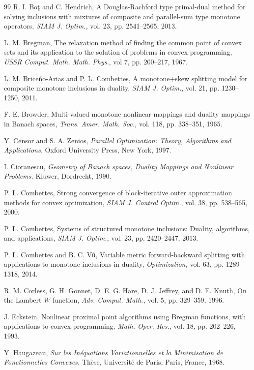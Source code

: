 \documentclass[a4paper,11pt,fleqn]{article}
\theoremstyle{plain}{\theorembodyfont{\rmfamily}%
\newtheorem{conjecture}[theorem]{Conjecture}}
\theoremstyle{plain}{\theorembodyfont{\rmfamily}%
\newtheorem{example}[theorem]{Example}}
\theoremstyle{plain}{\theorembodyfont{\rmfamily}%
\newtheorem{remark}[theorem]{Remark}}
\theoremstyle{plain}{\theorembodyfont{\rmfamily}%
\newtheorem{algorithm}[theorem]{Algorithm}}
\theoremstyle{plain}{\theorembodyfont{\rmfamily}%
\newtheorem{condition}[theorem]{Condition}}
\theoremstyle{plain}{\theorembodyfont{\rmfamily}%
\newtheorem{definition}[theorem]{Definition}}
\theoremstyle{plain}{\theorembodyfont{\rmfamily}
\newtheorem{problem}[theorem]{Problem}}
\theoremstyle{plain}{\theorembodyfont{\rmfamily}
\newtheorem{notation}[theorem]{Notation}}
\numberwithin{equation}{section}
\begin{document}
\begin{thebibliography}{99}
R. I. Bo{\c{t}} and C. Hendrich,
A Douglas-Rachford type primal-dual method for
solving inclusions with mixtures of composite and
parallel-sum type monotone operators,
{\em SIAM J. Optim.,}
vol. 23, pp. 2541--2565, 2013.

L. M. Bregman, 
The relaxation method of finding the common point of convex sets and
its application to the solution of problems in convex programming,
{\em USSR Comput. Math. Math. Phys.},
vol 7, pp. 200--217, 1967.

L. M. Brice\~{n}o-Arias and P. L. Combettes, 
A monotone+skew splitting model for composite monotone
inclusions in duality,
{\em SIAM J. Optim.},
vol. 21, pp. 1230--1250, 2011.

F. E. Browder, 
Multi-valued monotone nonlinear mappings and duality mappings in
Banach spaces,
{\em Trans. Amer. Math. Soc.,}  
vol. 118, pp. 338--351, 1965.

 Y. Censor and S. A. Zenios,
{\em Parallel Optimization: Theory, Algorithms and Applications.}
Oxford University Press, New York, 1997.

I. Cioranescu, 
{\em Geometry of Banach spaces, Duality Mappings and Nonlinear 
Problems.}  
Kluwer, Dordrecht, 1990.

P. L. Combettes, 
Strong convergence of block-iterative outer approximation methods 
for convex optimization,
{\em SIAM J. Control Optim.}, 
vol. 38, pp. 538--565, 2000.

P. L. Combettes,
Systems of structured monotone inclusions:
Duality, algorithms, and applications,
{\em SIAM J. Optim.,}
vol. 23, pp. 2420--2447, 2013.

P. L. Combettes and B. C. V\~u,
Variable metric forward-backward splitting with applications 
to monotone inclusions in duality,
{\em Optimization,} 
vol. 63, pp. 1289--1318, 2014.

R. M. Corless, G. H. Gonnet, D. E. G. Hare, D. J. Jeffrey, 
and D. E. Knuth, 
On the Lambert $W$ function,
{\em  Adv. Comput. Math.,} 
vol. 5, pp. 329--359, 1996.

J. Eckstein, 
Nonlinear proximal point algorithms using Bregman functions, 
with applications to convex programming,
{\em Math. Oper. Res.},
vol. 18, pp. 202--226, 1993.

Y. Haugazeau, 
{\em Sur les In\'equations Variationnelles et la Minimisation de 
Fonctionnelles Convexes.}
Th\`ese, Universit\'e de Paris, Paris, France, 1968.


\end{thebibliography}
\end{document}
